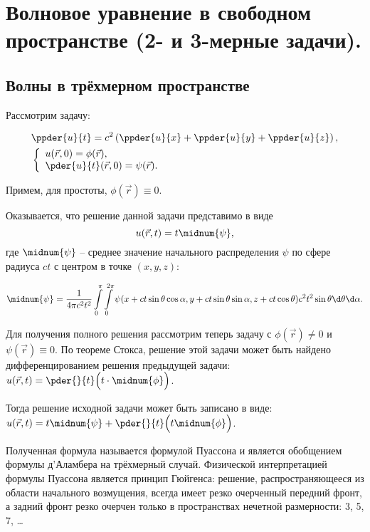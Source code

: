 \chapter{Волновое уравнение в свободном пространстве (2- и 3-мерные задачи).}

\section{Волны в трёхмерном пространстве}
Рассмотрим задачу:

\begin{minipage}{.33\textwidth}
    \begin{align*}
        & \ppder{u}{t} =
        c^2\left(\ppder{u}{x} + \ppder{u}{y} + \ppder{u}{z}\right), \\
        & \left\{ \begin{array}{l}
            u(\vec{r}, 0) = \phi(\vec{r}), \\
            \ds \pder{u}{t}(\vec{r}, 0) = \psi(\vec{r}).
        \end{array} \right.
    \end{align*}
\end{minipage}
\hfill
\begin{minipage}{.6\textwidth}
    Примем, для простоты, \( \phi(\vec{r}) \equiv 0 \).
    
    Оказывается, что решение данной задачи представимо в виде
    \[
        u(\vec{r}, t) = t\midnum{\psi},
    \]
    где \( \midnum{\psi} \) -- среднее значение начального распределения
    \( \psi \) по сфере радиуса \( ct \) с центром в точке \( (x, y, z) \):
\end{minipage}
\[
    \midnum{\psi} = \frac{1}{4\pi c^2t^2} \int\limits_0^\pi
    \int\limits_0^{2\pi} \psi(x + ct\sin\theta\cos\alpha, y + ct\sin\theta
    \sin\alpha, z + ct\cos\theta)c^2t^2\sin\theta\d\theta\d\alpha.
\]

Для получения полного решения рассмотрим теперь задачу с
\( \phi(\vec{r}) \neq 0 \) и \( \psi(\vec{r}) \equiv 0 \). По теореме Стокса,
решение этой задачи может быть найдено дифференцированием решения предыдущей
задачи: \( \ds u(\vec{r}, t) = \pder{}{t}\Bigl(t\cdot\midnum{\phi}\Bigr) \).

Тогда решение исходной задачи может быть записано в виде:
\( \ds u(\vec{r}, t) = t\midnum{\psi} + \pder{}{t}\Bigl(t\midnum{\phi}\Bigr) \).

Полученная формула называется формулой Пуассона и является обобщением формулы
д'Аламбера на трёхмерный случай. Физической интерпретацией формулы Пуассона
является принцип Гюйгенса: решение, распространяющееся из области начального
возмущения, всегда имеет резко очерченный передний фронт, а задний фронт резко
очерчен только в пространствах нечетной размерности: 3, 5, 7, \ldots

